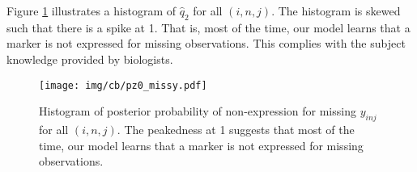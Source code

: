 \documentclass[12pt,]{article}
\begin{document}
Figure \ref{fig:hist-pz0-missy} illustrates a histogram of $\hat{q}_2$ for all
$(i, n, j)$. The histogram is skewed such that there is a spike at 1.  That is,
most of the time, our model learns that a marker is not expressed for missing
observations.  This complies with the subject knowledge provided by biologists. 

\begin{figure}
\begin{center}
  \texttt{[image: img/cb/pz0\_missy.pdf]}
  \caption{Histogram of posterior probability of non-expression for missing
  $y_{inj}$ for all $(i,n,j)$.  The peakedness at 1 suggests that most of the
  time, our model learns that a marker is not expressed for missing observations.}
  \label{fig:hist-pz0-missy}
\end{center}
\end{figure}
\end{document}

